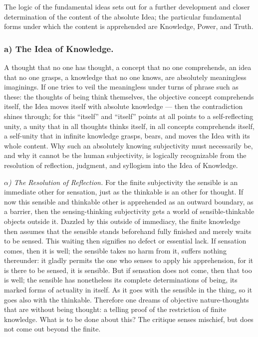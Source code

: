\documentclass[12pt]{book}
\begin{document}
The logic of the fundamental ideas sets out for a further development and closer
determination of the content of the absolute Idea; the particular fundamental
forms under which the content is apprehended are Knowledge, Power, and Truth.

\subsubsection*{a) The Idea of Knowledge.} A thought that no one has thought, a
concept that no one comprehends, an idea that no one grasps, a knowledge that no
one knows, are absolutely meaningless imaginings. If one tries to veil the
meaningless under turns of phrase such as these: the thoughts of being think
themselves, the objective concept comprehends itself, the Idea moves itself with
absolute knowledge --- then the contradiction shines through; for this ``itself''
and ``itself'' points at all points to a self-reflecting unity, a unity that in
all thoughts thinks itself, in all concepts comprehends itself, a self-unity that
in infinite knowledge grasps, bears, and moves the Idea with its whole content.
Why such an absolutely knowing subjectivity must necessarily be, and why it
cannot be the human subjectivity, is logically recognizable from the resolution
of reflection, judgment, and syllogism into the Idea of Knowledge.

\emph{$\alpha$) The Resolution of Reflection.} For the finite subjectivity the
sensible is an immediate other for sensation, just as the thinkable is an other
for thought. If now this sensible and thinkable other is apprehended as an
outward boundary, as a barrier, then the sensing-thinking subjectivity gets a
world of sensible-thinkable objects outside it. Dazzled by this outside of
immediacy, the finite knowledge then assumes that the sensible stands
beforehand fully finished and merely waits to be sensed. This waiting then
signifies no defect or essential lack. If sensation comes, then it is well; the
sensible takes no harm from it, suffers nothing thereunder: it gladly permits the
one who senses to apply his apprehension, for it is there to be sensed, it is
sensible. But if sensation does not come, then that too is well; the sensible has
nonetheless its complete determinations of being, its marked forms of actuality
in itself. As it goes with the sensible in the thing, so it goes also with the
thinkable. Therefore one dreams of objective nature-thoughts that are without
being thought: a telling proof of the restriction of finite knowledge. What is to
be done about this? The critique senses mischief, but does not come out beyond
the finite.
\end{document}
